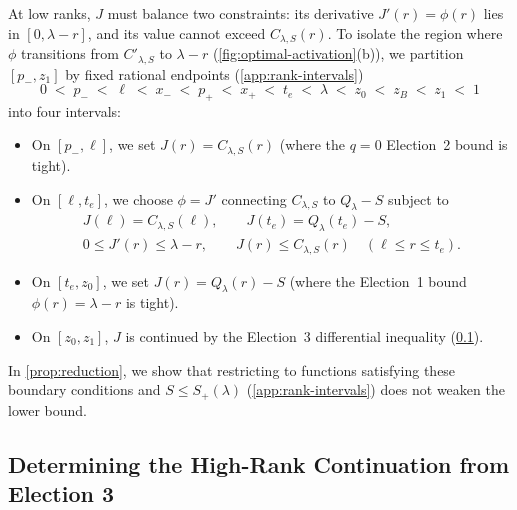 \documentclass[11pt]{article}
\numberwithin{equation}{section}
\theoremstyle{plain}
\theoremstyle{definition}
\newcommand{\1}{\mathbf{1}}
\begin{document}
At low ranks, $J$ must balance two constraints: its derivative $J'(r) = \phi(r)$ lies in $[0, \lambda - r]$, and its value cannot exceed $C_{\lambda, S}(r)$. To isolate the region where $\phi$ transitions from $C'_{\lambda, S}$ to $\lambda - r$ (\cref{fig:optimal-activation}(b)), we partition $[p_-, z_1]$ by fixed rational endpoints (\cref{app:rank-intervals})
\[
  0 \;<\; p_- \;<\; \ell \;<\; x_- \;<\; p_+ \;<\; x_+ \;<\; t_e \;<\; \lambda \;<\; z_0 \;<\; z_B \;<\; z_1 \;<\; 1
\]
into four intervals:
\begin{itemize}
  \item On $[p_-, \ell]$, we set $J(r) = C_{\lambda, S}(r)$ (where the $q = 0$ Election~2 bound is tight).
  \item On $[\ell, t_e]$, we choose $\phi = J'$ connecting $C_{\lambda, S}$ to $Q_\lambda - S$ subject to
  \begin{equation}
    \begin{gathered}
      J(\ell) = C_{\lambda, S}(\ell), \qquad J(t_e) = Q_\lambda(t_e) - S, \\
      0 \le J'(r) \le \lambda - r, \qquad J(r) \le C_{\lambda, S}(r) \quad (\ell \le r \le t_e).
    \end{gathered}
    \label{eq:low-constraints}
  \end{equation}
  \item On $[t_e, z_0]$, we set $J(r) = Q_\lambda(r) - S$ (where the Election~1 bound $\phi(r) = \lambda - r$ is tight).
  \item On $[z_0, z_1]$, $J$ is continued by the Election~3 differential inequality (\cref{sec:high-ranks}).
\end{itemize}
In \cref{prop:reduction}, we show that restricting to functions satisfying these boundary conditions and $S \le S_+(\lambda)$ (\cref{app:rank-intervals}) does not weaken the lower bound.

\subsection{Determining the High-Rank Continuation from Election 3}
\label{sec:high-ranks}
\end{document}
